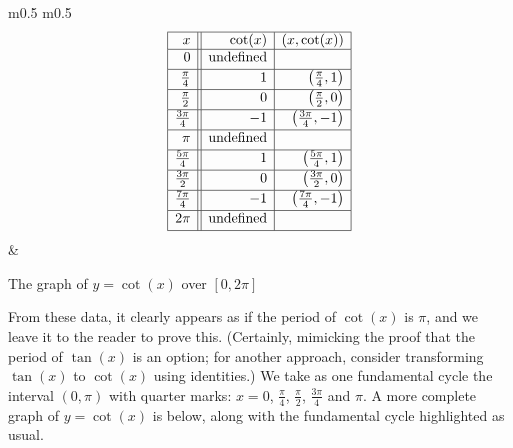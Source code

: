 \hskip-20pt\begin{minipage}{\textwidth}
\begin{center}
\begin{tabular}{m{} m{}}
\setlength{\extrarowheight}{2pt}
\[ \begin{array}{|r||r|r|}  

\hline

 x & \cot(x) & (x,\cot(x)) \\ \hline
0  & \text{undefined} &  \\ [2pt]   \hline
\frac{\pi}{4}  & 1 & \left(\frac{\pi}{4},1 \right) \\ [2pt] \hline 
\frac{\pi}{2}  & 0 & \left(\frac{\pi}{2},0 \right)  \\ [2pt] \hline 
\frac{3\pi}{4}  & -1 & \left(\frac{3\pi}{4}, -1\right) \\ [2pt] \hline 
\pi & \text{undefined} &  \\ [2pt] \hline 
\frac{5\pi}{4}  & 1 & \left(\frac{5\pi}{4}, 1 \right) \\ [2pt] \hline 
\frac{3\pi}{2}  & 0 & \left(\frac{3\pi}{2}, 0 \right) \\ [2pt] \hline 
\frac{7\pi}{4}  & -1 & \left(\frac{7\pi}{4}, -1 \right) \\ [2pt] \hline 
2\pi  & \text{undefined} &  \\  [2pt] \hline
\end{array} \] \setlength{\extrarowheight}{0pt} & 

\end{tabular}
\end{center}
\captionsetup{type=figure}
\caption{The graph of $y = \cot(x)$ over $[0,2\pi]$}\label{fig:cotgraph1}
\end{minipage}

\medskip


From these data, it clearly appears as if the period of $\cot(x)$ is $\pi$, and we leave it to the reader to prove this. (Certainly, mimicking the proof that the period of $\tan(x)$ is an option;  for another approach, consider transforming $\tan(x)$ to $\cot(x)$ using identities.)  We take as one fundamental cycle the interval $(0,\pi)$ with quarter marks:  $x= 0$, $\frac{\pi}{4}$, $\frac{\pi}{2}$, $\frac{3\pi}{4}$ and $\pi$.  A more complete graph of $y=\cot(x)$ is below, along with the fundamental cycle highlighted as usual.    

\medskip


